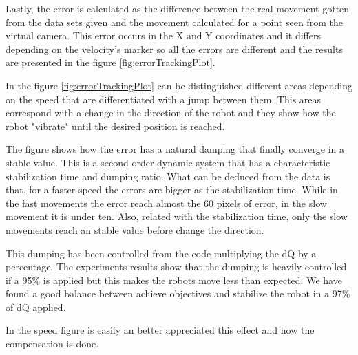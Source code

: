 Lastly, the error is calculated as the difference between the real movement gotten from the data sets given and the movement calculated for a point seen from the virtual camera.
This error occurs in the X and Y coordinates and it differs depending on the velocity's marker so all the errors are different and the results are presented in the figure \ref{fig:errorTrackingPlot}.

	\ifx \plots \yes
		\errorTrackingPlot
	\fi
	
In the figure \ref{fig:errorTrackingPlot} can be distinguished different areas depending on the speed that are differentiated with a jump between them. 
This areas correspond with a change in the direction of the robot and they show how the robot "vibrate" until the desired position is reached.

The figure shows how the error has a natural damping that finally converge in a stable value. This is a second order dynamic system that has a characteristic stabilization time and dumping ratio. What can be deduced from the data is that, for a faster speed the errors are bigger as the stabilization time. While in the fast movements the error reach almost the 60 pixels of error, in the slow movement it is under ten. Also, related with the stabilization time, only the slow movements reach an stable value before change the direction.

This dumping has been controlled from the code multiplying the dQ by a percentage. The experiments results show that the dumping is heavily controlled if a 95\% is applied but this makes the robots move less than expected. We have found a good balance between achieve objectives and stabilize the robot in a 97\% of dQ applied.

In the speed figure is easily an better appreciated this effect and how the compensation is done.

